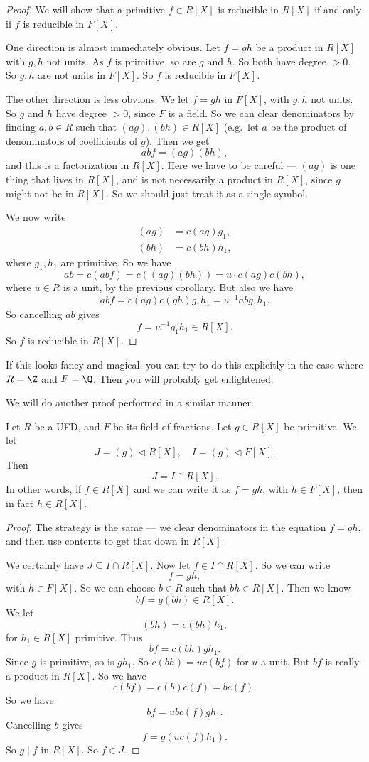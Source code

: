 \documentclass[a4paper]{article}
\begin{document}
\begin{proof}
  We will show that a primitive $f \in R[X]$ is reducible in $R[X]$ if and only if $f$ is reducible in $F[X]$.

  One direction is almost immediately obvious. Let $f = gh$ be a product in $R[X]$ with $g, h$ not units. As $f$ is primitive, so are $g$ and $h$. So both have degree $> 0$. So $g, h$ are not units in $F[X]$. So $f$ is reducible in $F[X]$.

  The other direction is less obvious. We let $f = gh$ in $F[X]$, with $g, h$ not units. So $g$ and $h$ have degree $> 0$, since $F$ is a field. So we can clear denominators by finding $a, b \in R$ such that $(ag), (bh) \in R[X]$ (e.g.\ let $a$ be the product of denominators of coefficients of $g$). Then we get
  \[
    ab f = (ag)(bh),
  \]
  and this is a factorization in $R[X]$. Here we have to be careful --- $(ag)$ is one thing that lives in $R[X]$, and is not necessarily a product in $R[X]$, since $g$ might not be in $R[X]$. So we should just treat it as a single symbol.

  We now write
  \begin{align*}
    (ag) &= c(ag) g_1,\\
    (bh) &= c(bh) h_1,
  \end{align*}
  where $g_1, h_1$ are primitive. So we have
  \[
    ab = c(abf) = c((ag)(bh)) = u \cdot c(ag)c(bh),
  \]
  where $u \in R$ is a unit, by the previous corollary. But also we have
  \[
    abf = c(ag)c(gh) g_1 h_1 = u^{-1}ab g_1 h_1.
  \]
  So cancelling $ab$ gives
  \[
    f = u^{-1} g_1 h_1 \in R[X].
  \]
  So $f$ is reducible in $R[X]$.
\end{proof}
If this looks fancy and magical, you can try to do this explicitly in the case where $R = \Z$ and $F = \Q$. Then you will probably get enlightened.

We will do another proof performed in a similar manner.
\begin{prop}
  Let $R$ be a UFD, and $F$ be its field of fractions. Let $g \in R[X]$ be primitive. We let
  \[
    J = (g) \lhd R[X],\quad I = (g) \lhd F[X].
  \]
  Then
  \[
    J = I \cap R[X].
  \]
  In other words, if $f \in R[X]$ and we can write it as $f = gh$, with $h \in F[X]$, then in fact $h \in R[X]$.
\end{prop}

\begin{proof}
  The strategy is the same --- we clear denominators in the equation $f = gh$, and then use contents to get that down in $R[X]$.

  We certainly have $J \subseteq I \cap R[X]$. Now let $f \in I \cap R[X]$. So we can write
  \[
    f = gh,
  \]
  with $h \in F[X]$. So we can choose $b \in R$ such that $bh \in R[X]$. Then we know
  \[
    bf = g(bh) \in R[X].
  \]
  We let
  \[
    (bh) = c(bh) h_1,
  \]
  for $h_1 \in R[X]$ primitive. Thus
  \[
    bf = c(bh) g h_1.
  \]
  Since $g$ is primitive, so is $gh_1$. So $c(bh) = u c(bf)$ for $u$ a unit. But $b f$ is really a product in $R[X]$. So we have
  \[
    c(bf) = c(b)c(f) = bc(f).
  \]
  So we have
  \[
    bf = ubc(f) g h_1.
  \]
  Cancelling $b$ gives
  \[
    f = g (uc(f)h_1).
  \]
  So $g \mid f$ in $R[X]$. So $f \in J$.
\end{proof}
\end{document}
